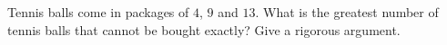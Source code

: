 Tennis balls come in packages of $4$, $9$ and $13$. What is the greatest number of tennis balls that cannot be bought exactly? Give a rigorous argument.
